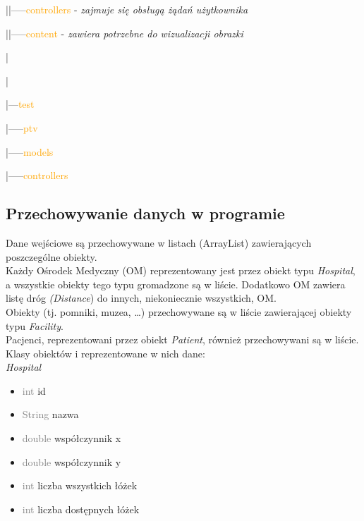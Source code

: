 \documentclass[]{article}
\begin{document}
    |\hspace{15mm}|-----\textcolor{orange}{controllers} -\textit{ zajmuje się obsługą żądań użytkownika}

    |\hspace{15mm}|-----\textcolor{orange}{content} -\textit{ zawiera potrzebne do wizualizacji obrazki}

    |

    |

    |---\textcolor{orange}{test}

    \hspace{5mm} |-----\textcolor{orange}{ptv}

    \hspace{16mm}|-----\textcolor{orange}{models}

    \hspace{16mm}|-----\textcolor{orange}{controllers}

    \subsection{Przechowywanie danych w programie} %
    Dane wejściowe są przechowywane w listach (ArrayList) zawierających poszczególne obiekty. \\
    Każdy Ośrodek Medyczny (OM) reprezentowany jest przez obiekt typu\textit{ Hospital}, a wszystkie obiekty tego typu gromadzone są w liście. Dodatkowo OM zawiera listę dróg \textit{(Distance}) do innych, niekoniecznie wszystkich, OM.\\
    Obiekty (tj. pomniki, muzea, \ldots) przechowywane są w liście zawierającej obiekty typu \textit{Facility}.\\
    Pacjenci, reprezentowani przez obiekt \textit{Patient}, również przechowywani są w liście.\\

    Klasy obiektów i reprezentowane w nich dane:\\


    \textit{Hospital}
    \begin{itemize}
        \item  \textcolor{gray}{int} id
        \item  \textcolor{gray}{String} nazwa
        \item  \textcolor{gray}{double} współczynnik x
        \item \textcolor{gray}{double}  współczynnik y
        \item \textcolor{gray}{int}  liczba wszystkich łóżek
        \item \textcolor{gray}{int}  liczba dostępnych łóżek
    \end{itemize}
\end{document}
